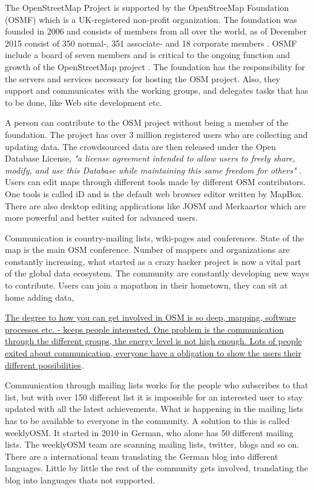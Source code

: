 The OpenStreetMap Project is supported by the OpenStreeMap Foundation (OSMF) which is a UK-registered non-profit organization. The foundation was founded in 2006 and consists of members from all over the world, as of December 2015 consist of 350 normal-, 351 associate- and 18 corporate members \cite{OSMF2015}. OSMF include a board of seven members and is critical to the ongoing function and growth of the OpenStreetMap project \cite{OSMF}.  The foundation has the responsibility for the servers and services necessary for hosting the OSM project. Also, they support and communicates with the working groups, and delegates tasks that has to be done, like Web site development etc. 

A person can contribute to the OSM project without being a member of the foundation. The project has over 3 million registered users \cite{OSMProject2016} who are collecting and updating data. The crowdsourced data are then released under the Open Database License, \textit{"a license agreement intended to allow users to freely share, modify, and use this Database while maintaining this same freedom for others"} \cite{ODbL}.  Users can edit maps through different tools made by different OSM contributors. One tools is called iD and is the default web browser editor written by MapBox. There are also desktop editing applications like JOSM and Merkaartor which are more powerful and better suited for advanced users. 

Communication is country-mailing lists, wiki-pages and conferences. State of the map is the main OSM conference. Number of mappers and organizations are constantly increasing, what started as a crazy hacker project is now a vital part of the global data ecosystem. The community are constantly developing new ways to contribute.  Users can join a mapathon in their hometown, they can sit at home adding data, 

\href{http://2016.stateofthemap.org/2016/a-map-of-openstreetmap/}{The degree to how you can get involved in OSM is so deep, mapping, software processes etc. - keeps people interested. One problem is the communication through the different groups, the energy level is not high enough.  Lots of people exited about communication, everyone have a obligation to show the users their different possibilities}.   

Communication through mailing lists works for the people who subscribes to that list, but with over 150 different list it is impossible for an interested user to stay updated with all the latest achievements.  What is happening in the mailing lists has to be available to everyone in the community. A solution to this is called weeklyOSM. It started in 2010 in German, who alone has 50 different mailing lists. The weeklyOSM team are scanning mailing lists, twitter, blogs and so on. There are a international team translating the German blog into different languages. Little by little the rest of the community gets involved, translating the blog into languages thats not supported. 

